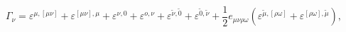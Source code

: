 \begin{equation}
\Gamma _\nu =\varepsilon ^{\mu ,[\mu \nu ]}+\varepsilon ^{[\mu \nu
],\mu }+\varepsilon ^{\nu ,0}+\varepsilon ^{o,\nu }+\varepsilon
^{\widetilde{\nu }, \widetilde{0}}+\varepsilon
^{\widetilde{0},\widetilde{\nu }}+\frac 12e_{\mu \nu \rho \omega
}\left( \varepsilon ^{\widetilde{\mu },[\rho \omega ]}+\varepsilon
^{[\rho \omega ],\widetilde{\mu }}\right) , \label{19}
\end{equation}

